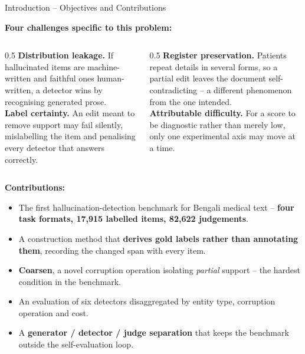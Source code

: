 \documentclass[aspectratio=169,11pt]{beamer}
\begin{document}
\begin{frame}{Introduction \;--\; Objectives and Contributions}
\vspace{-1mm}
{\small
\textbf{Four challenges specific to this problem:}
\vspace{1mm}
\begin{columns}[T]
\begin{column}{0.5\textwidth}\footnotesize
\textbf{Distribution leakage.} If hallucinated items are machine-written and faithful ones human-written, a detector wins by recognising generated prose.\\[2mm]
\textbf{Label certainty.} An edit meant to remove support may fail silently, mislabelling the item and penalising every detector that answers correctly.
\end{column}
\begin{column}{0.5\textwidth}\footnotesize
\textbf{Register preservation.} Patients repeat details in several forms, so a partial edit leaves the document self-contradicting -- a different phenomenon from the one intended.\\[2mm]
\textbf{Attributable difficulty.} For a score to be diagnostic rather than merely low, only one experimental axis may move at a time.
\end{column}
\end{columns}
\vspace{3.5mm}
\textbf{Contributions:}
\begin{itemize}\setlength\itemsep{0.9mm}\footnotesize
  \item The first hallucination-detection benchmark for Bengali medical text -- \textbf{four task formats, 17,915 labelled items, 82,622 judgements}.
  \item A construction method that \textbf{derives gold labels rather than annotating them}, recording the changed span with every item.
  \item \textbf{Coarsen}, a novel corruption operation isolating \emph{partial} support -- the hardest condition in the benchmark.
  \item An evaluation of six detectors disaggregated by entity type, corruption operation and cost.
  \item A \textbf{generator / detector / judge separation} that keeps the benchmark outside the self-evaluation loop.
\end{itemize}
}
\end{frame}
\end{document}
